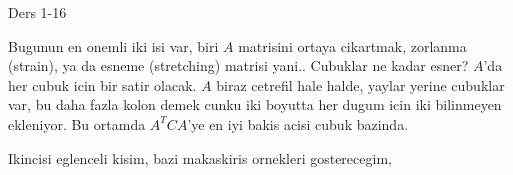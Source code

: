 \documentclass[12pt,fleqn]{article}\usepackage{../../common}
\begin{document}
Ders 1-16

Bugunun en onemli iki isi var, biri $A$ matrisini ortaya cikartmak, zorlanma
(strain), ya da esneme (stretching) matrisi yani.. Cubuklar ne kadar esner?
$A$'da her cubuk icin bir satir olacak. $A$ biraz cetrefil hale halde, yaylar
yerine cubuklar var, bu daha fazla kolon demek cunku iki boyutta her dugum
icin iki bilinmeyen ekleniyor. Bu ortamda $A^T C A$'ye en iyi bakis acisi
cubuk bazinda. 

Ikincisi eglenceli kisim, bazi makaskiris ornekleri gosterecegim, 
\end{document}
